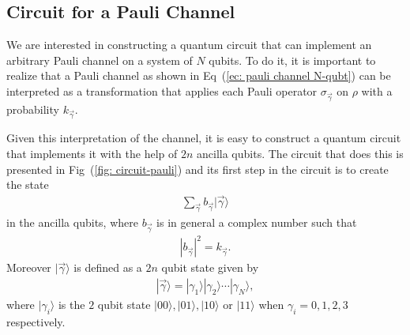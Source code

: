 \documentclass[10pt,letterpaper]{article}
\begin{document}
\subsection*{Circuit for a Pauli Channel}
\label{subsec: Circuit for a Pauli Channel}

We are interested in constructing a quantum circuit that can implement an
arbitrary Pauli channel on a system of $N$ qubits. 
To do it, it is important to realize that a Pauli channel
 as shown in Eq~(\ref{ec: pauli channel N-qubt})  can 
be interpreted as a transformation that applies
each Pauli operator $\sigma_{\vec{\gamma}}$ on $\rho$ with a probability $k_{\vec{\gamma}}$.

Given this interpretation of the channel, 
it is easy to construct a quantum circuit that implements 
it with the help of $2n$ ancilla qubits.
The circuit that does this is presented in Fig~(\ref{fig: circuit-pauli}) and its 
first step in the circuit is to create the state
\begin{eqnarray}
\label{ec: state}
\sum_{\vec{\gamma}} b_{\vec{\gamma}} |\vec{\gamma} \rangle
\end{eqnarray}
in the ancilla qubits, 
where $b_{\vec{\gamma}}$ is in general a complex number such that 
\begin{eqnarray}
\label{ec: b}
|b_{\vec{\gamma}}|^2 = k_{\vec{\gamma}}.
\end{eqnarray}
Moreover $|\vec{\gamma}\rangle$ is defined as a $2n$ qubit state given by
\begin{eqnarray}
|\vec{\gamma} \rangle = |\gamma_1\rangle |\gamma_2 \rangle \cdots |\gamma_N \rangle,
\end{eqnarray}
where $|\gamma_i \rangle$ is the $2$ qubit state $|00\rangle, |01\rangle , |10\rangle$ or $|11\rangle$ when $\gamma_i = 0,1,2,3$ respectively. \\
\end{document}
